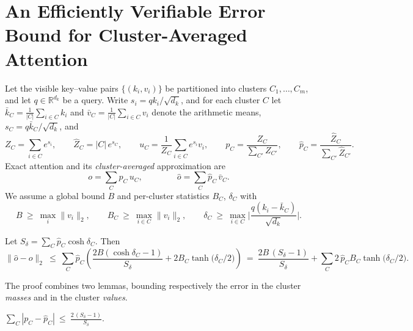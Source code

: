 

\section{An Efficiently Verifiable Error Bound for Cluster-Averaged Attention}

Let the visible key--value pairs $\{(k_i, v_i)\}$ be partitioned into clusters
$C_1, \dots, C_m$, and let $q \in \mathbb R^{d_k}$ be a query. Write
$s_i = q k_i / \sqrt{d_k}$, and for each cluster $C$ let
$\bar k_C = \frac{1}{|C|} \sum_{i \in C} k_i$ and
$\bar v_C = \frac{1}{|C|} \sum_{i \in C} v_i$ denote the arithmetic means,
$s_C = q \bar k_C / \sqrt{d_k}$, and
\[
Z_C = \sum_{i\in C} e^{s_i}, \qquad
\hat Z_C = |C|\, e^{s_C}, \qquad
u_C = \frac{1}{Z_C}\sum_{i\in C} e^{s_i} v_i, \qquad
p_C = \frac{Z_C}{\sum_{C'} Z_{C'}}, \qquad
\hat p_C = \frac{\hat Z_C}{\sum_{C'} \hat Z_{C'}} .
\]
Exact attention and its \emph{cluster-averaged} approximation are
\[
o = \sum_C p_C\, u_C,
\qquad\qquad
\hat o = \sum_C \hat p_C\, \bar v_C .
\]
We assume a global bound $B$ and per-cluster statistics $B_C$, $\delta_C$ with
\[
B \ \ge\ \max_i \|v_i\|_2, \qquad
B_C \ \ge\ \max_{i\in C} \|v_i\|_2, \qquad
\delta_C \ \ge\ \max_{i\in C} \Big| \frac{q (k_i - \bar k_C)}{\sqrt{d_k}} \Big| .
\]

\begin{theorem}\label{thm:condition}
Let $S_\delta = \sum_C \hat p_C \cosh \delta_C$. Then
\[
\|\hat o - o\|_2
\ \le\
\sum_{C} \hat p_{C} \left(
\frac{2B \left( \cosh\delta_C - 1 \right)}{S_\delta}
+ 2 B_C \tanh\!\big(\delta_C/2\big)
\right)
\ =\
\frac{2B\,(S_\delta - 1)}{S_\delta}
+ \sum_C 2\, \hat p_C B_C \tanh\!\big(\delta_C/2\big).
\]
\end{theorem}

The proof combines two lemmas, bounding respectively the error in the cluster
\emph{masses} and in the cluster \emph{values}.

\begin{lemma}[mass]\label{lem:mass}
$\displaystyle \sum_C |p_C - \hat p_C| \ \le\ \frac{2\,(S_\delta - 1)}{S_\delta}$.
\end{lemma}

